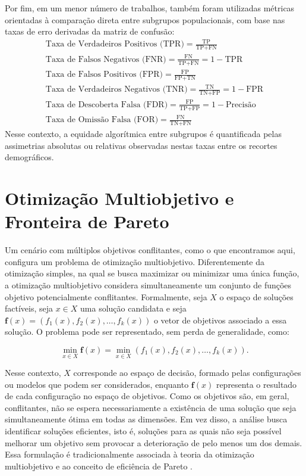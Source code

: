Por fim, em um menor número de trabalhos, também foram utilizadas métricas orientadas à comparação direta entre subgrupos populacionais, com base nas taxas de erro derivadas da matriz de confusão:
\begin{gather}
\text{Taxa de Verdadeiros Positivos (TPR)} = \frac{\text{TP}}{\text{TP} + \text{FN}} \\[8pt]
\text{Taxa de Falsos Negativos (FNR)} = \frac{\text{FN}}{\text{TP} + \text{FN}} = 1 - \text{TPR} \\[8pt]
\text{Taxa de Falsos Positivos (FPR)} = \frac{\text{FP}}{\text{FP} + \text{TN}} \\[8pt]
\text{Taxa de Verdadeiros Negativos (TNR)} = \frac{\text{TN}}{\text{TN} + \text{FP}} = 1 - \text{FPR} \\[8pt]
\text{Taxa de Descoberta Falsa (FDR)} = \frac{\text{FP}}{\text{TP} + \text{FP}} = 1 - \text{Precisão} \\[8pt]
\text{Taxa de Omissão Falsa (FOR)} = \frac{\text{FN}}{\text{TN} + \text{FN}}
\end{gather}
Nesse contexto, a equidade algorítmica entre subgrupos é quantificada pelas assimetrias absolutas ou relativas observadas nestas taxas entre os recortes demográficos.

\section{Otimização Multiobjetivo e Fronteira de Pareto}
\label{sec:moop_pareto}

Um cenário com múltiplos objetivos conflitantes, como o que encontramos aqui, configura um problema de otimização multiobjetivo. Diferentemente da otimização simples, na qual se busca maximizar ou minimizar uma única função, a otimização multiobjetivo considera simultaneamente um conjunto de funções objetivo potencialmente conflitantes. Formalmente, seja $X$ o espaço de soluções factíveis, seja $x \in X$ uma solução candidata e seja
$\mathbf{f}(x) = (f_1(x), f_2(x), \ldots, f_k(x))$ o vetor de objetivos
associado a essa solução. O problema pode ser representado, sem perda
de generalidade, como:

\begin{equation}
    \min_{x \in X} \mathbf{f}(x)
    =
    \min_{x \in X}
    \left(f_1(x), f_2(x), \ldots, f_k(x)\right).
\end{equation}

Nesse contexto, $X$ corresponde ao espaço de decisão, formado pelas
configurações ou modelos que podem ser considerados, enquanto
$\mathbf{f}(x)$ representa o resultado de cada configuração no espaço
de objetivos. Como os objetivos são, em geral, conflitantes, não se
espera necessariamente a existência de uma solução que seja
simultaneamente ótima em todas as dimensões. Em vez disso, a análise
busca identificar soluções eficientes, isto é, soluções para as quais
não seja possível melhorar um objetivo sem provocar a deterioração de
pelo menos um dos demais. Essa formulação é tradicionalmente associada
à teoria da otimização multiobjetivo e ao conceito de eficiência de
Pareto \cite{pareto1964cours}.

